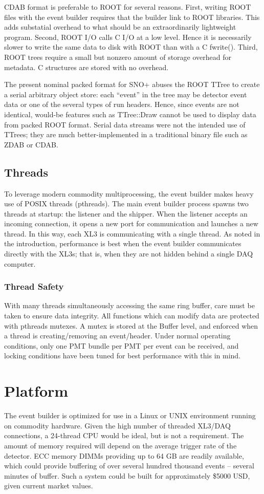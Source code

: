 \documentclass[11pt,twocolumn]{article}
\begin{document}
CDAB format is preferable to ROOT for several reasons. First, writing ROOT files with the event builder requires that the builder link to ROOT libraries. This adds substatial overhead to what should be an extraordinarily lightweight program. Second, ROOT I/O calls C I/O at a low level. Hence it is necessarily slower to write the same data to disk with ROOT than with a C fwrite(). Third, ROOT trees require a small but nonzero amount of storage overhead for metadata. C structures are stored with no overhead.

The present nominal packed format for SNO+ abuses the ROOT TTree to create a serial arbitrary object store: each ``event'' in the tree may be detector event data or one of the several types of run headers. Hence, since events are not identical, would-be features such as TTree::Draw cannot be used to display data from packed ROOT format. Serial data streams were not the intended use of TTrees; they are much better-implemented in a traditional binary file such as ZDAB or CDAB.

\subsection{Threads}
To leverage modern commodity multiprocessing, the event builder makes heavy use of POSIX threads (pthreads). The main event builder process spawns two threads at startup: the listener and the shipper. When the listener accepts an incoming connection, it opens a new port for communication and launches a new thread. In this way, each XL3 is communicating with a single thread. As noted in the introduction, performance is best when the event builder communicates directly with the XL3s; that is, when they are not hidden behind a single DAQ computer.

\subsubsection{Thread Safety}
With many threads simultaneously accessing the same ring buffer, care must be taken to ensure data integrity. All functions which can modify data are protected with pthreads mutexes. A mutex is stored at the Buffer level, and enforced when a thread is creating/removing an event/header. Under normal operating conditions, only one PMT bundle per PMT per event can be received, and locking conditions have been tuned for best performance with this in mind.

\section{Platform}
The event builder is optimized for use in a Linux or UNIX environment running on commodity hardware. Given the high number of threaded XL3/DAQ connections, a 24-thread CPU would be ideal, but is not a requirement. The amount of memory required will depend on the average trigger rate of the detector. ECC memory DIMMs providing up to 64 GB are readily available, which could provide buffering of over several hundred thousand events -- several minutes of buffer. Such a system could be built for approximately \$5000 USD, given current market values.
\end{document}
